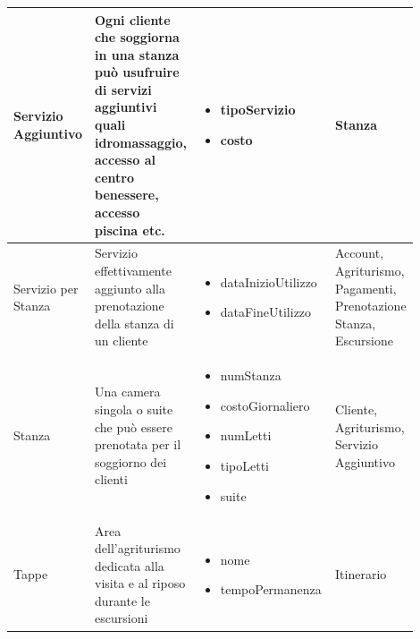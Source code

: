 \documentclass[12pt,a4paper]{article}
\begin{document}
\begin{center}
\begin{longtable}{|p{0.14\linewidth}|p{0.20\linewidth}|p{0.36\linewidth}|p{0.20\linewidth}|}
\hline
Servizio Aggiuntivo				 	&  Ogni cliente che soggiorna in una stanza può usufruire di servizi aggiuntivi quali idromassaggio, accesso al centro benessere, accesso piscina etc. 
					& \begin{itemize}
						\setlength{\itemindent}{-1em}
						\vspace{-25pt}
						\setlength\itemsep{-0.25em}
						\item tipoServizio
						\item costo
					\end{itemize}
					&  Stanza  \\ 

\hline
Servizio per Stanza				 	&  Servizio effettivamente aggiunto alla prenotazione della stanza di un cliente 
					& \begin{itemize}
						\setlength{\itemindent}{-1em}
						\vspace{-25pt}
						\setlength\itemsep{-0.25em}
						\item dataInizioUtilizzo
						\item dataFineUtilizzo
					\end{itemize}
					&  Account, Agriturismo, Pagamenti, Prenotazione Stanza, Escursione  \\ 

\hline
Stanza				 	&  Una camera singola o suite che può essere prenotata per il soggiorno dei clienti 
					& \begin{itemize}
						\setlength{\itemindent}{-1em}
						\vspace{-25pt}
						\setlength\itemsep{-0.25em}
						\item numStanza
						\item costoGiornaliero
						\item numLetti
						\item tipoLetti
						\item suite
					\end{itemize}
					&  Cliente, Agriturismo, Servizio Aggiuntivo  \\ 

\hline
Tappe				 	&  Area dell'agriturismo dedicata alla visita e al riposo durante le escursioni 
					& \begin{itemize}
						\setlength{\itemindent}{-1em}
						\vspace{-25pt}
						\setlength\itemsep{-0.25em}
						\item nome
						\item tempoPermanenza
					\end{itemize}
					&  Itinerario  \\ 

\hline


\end{longtable}
\end{center}
\end{document}
